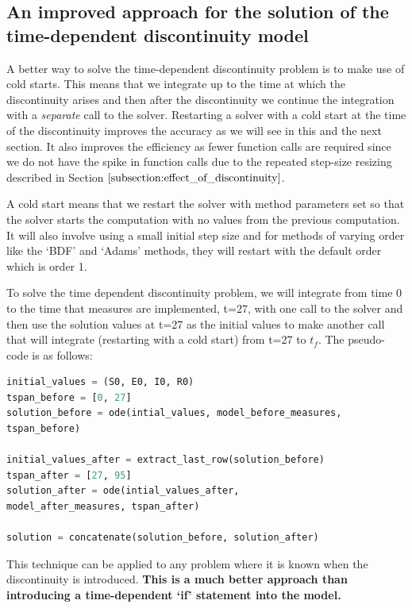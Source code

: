 \subsection{An improved approach for the solution 
of the time-dependent discontinuity model}
\label{subsection:time_disc_handling}
A better way to solve the time-dependent discontinuity problem is to make use of cold starts. This means that we integrate up to the time at which the discontinuity arises and then after the discontinuity we continue the integration with a \emph{separate} call to the solver. Restarting a solver with a cold start at the time of the discontinuity improves the accuracy as we will see in this and the next section. It also improves the efficiency as fewer function calls are required since we do not have the spike in function calls due to the repeated step-size resizing described in Section $\ref{subsection:effect_of_discontinuity}$.

A cold start means that we restart the solver with method parameters set so that the solver starts the computation with no values from the previous computation. It will also involve using a small initial step size and for methods of varying order like the `BDF' and `Adams' methods, they will restart with the default order which is order 1.

To solve the time dependent discontinuity problem, we will integrate from time 0 to the time that measures are implemented, t=27, with one call to the solver and then use the solution values at t=27 as the initial values to make another call that will integrate (restarting with a cold start) from t=27 to $t_f$. The pseudo-code is as follows:

\begin{minipage}{\linewidth}
\begin{lstlisting}[language=Python]
initial_values = (S0, E0, I0, R0)
tspan_before = [0, 27]
solution_before = ode(intial_values, model_before_measures,
tspan_before)

initial_values_after = extract_last_row(solution_before)
tspan_after = [27, 95]
solution_after = ode(intial_values_after, 
model_after_measures, tspan_after)

solution = concatenate(solution_before, solution_after)
\end{lstlisting}
\end{minipage}

This technique can be applied to any problem where it is known when the discontinuity is introduced. {\bfseries This is a much better approach than introducing a time-dependent `if' statement into the model.}


